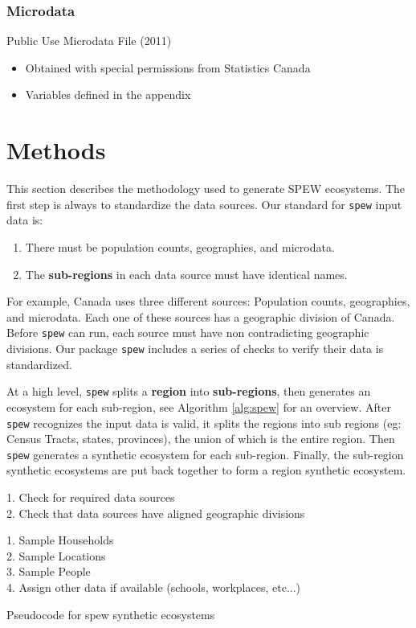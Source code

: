 \documentclass{article}
\begin{document}
		\subsubsection{Microdata}
		Public Use Microdata File (2011) 
		\begin{itemize}
			\item Obtained with special permissions from Statistics Canada
			\item Variables defined in the appendix
		\end{itemize}

\newpage
\section{Methods}		
	This section describes the methodology used to generate SPEW ecosystems. The first step is always to standardize the data sources. Our standard for \verb|spew| input data is:

	\begin{enumerate}
		\item There must be population counts, geographies, and microdata. 
		\item The \textbf{sub-regions} in each data source must have identical names. 
	\end{enumerate}

	For example, Canada uses three different sources: Population counts, geographies, and microdata. Each one of these sources has a geographic division of Canada. Before \verb|spew| can run, each source must have non contradicting geographic divisions. Our package \verb|spew| includes a series of checks to verify their data is standardized.  

	At a high level, \verb|spew| splits a \textbf{region} into \textbf{sub-regions}, then generates an ecosystem for each sub-region, see Algorithm \ref{alg:spew} for an overview. After \verb|spew| recognizes the input data is valid, it splits the regions into sub regions (eg: Census Tracts, states, provinces), the union of which is the entire region. Then \verb|spew| generates a synthetic ecosystem for each sub-region. Finally, the sub-region synthetic ecosystems are put back together to form a region synthetic ecosystem.

	\vspace{2mm}	
	\begin{algorithm}[H]
	\label{alg:spew}
	\SetAlgoLined

	   1. Check for required data sources \\
	   2. Check that data sources have aligned geographic divisions 

	  {
	 	1. Sample Households \\
	 	2. Sample Locations \\
	 	3. Sample People \\
	 	4. Assign other data if available (schools, workplaces, etc...) 
	  }
	   \
	 \caption{Pseudocode for spew synthetic ecosystems} 
	\end{algorithm}
	\vspace{2mm}
\end{document}
